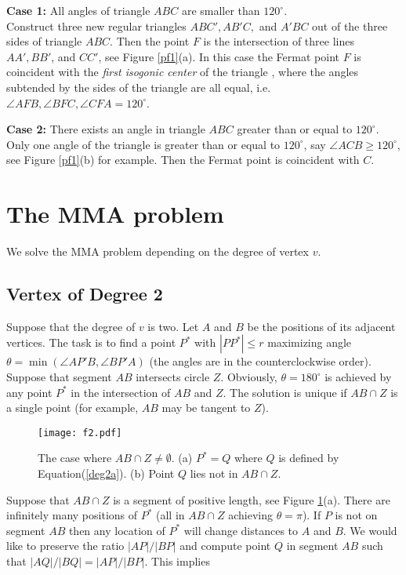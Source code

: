\documentclass[10pt]{article}
\begin{document}
 {\bf Case 1:}  All angles of triangle $ABC$ are smaller than $120^\circ$.\\
Construct three new regular triangles $ABC', AB'C,$ and $A'BC$ out of the three sides of triangle $ABC$.
Then the point $F$ is the intersection of three lines $AA',BB'$, and $CC'$, see Figure \ref{pf1}(a). 
In this case the Fermat point $F$  is coincident with the {\em first isogonic center} 
of the triangle \cite{Eric}, where the angles subtended by the sides of the triangle are all equal, 
i.e.  $\angle AFB, \angle BFC, \angle CFA=120^\circ$.

{\bf Case 2:}  There exists an angle  in triangle $ABC$ greater than or equal to $120^\circ$.\\
Only one angle of the triangle is greater than or equal to $120^\circ$, say $\angle ACB\ge 120^\circ$, see Figure \ref{pf1}(b) for example.
Then the Fermat point is coincident with $C$.





\section{The MMA problem} \label{s:MAA}

We solve the MMA problem depending on the degree of vertex $v$. 

\subsection{Vertex of Degree 2} \label{sectdeg2}

Suppose that the degree of $v$ is two.  
Let $A$ and $B$ be the positions of its adjacent vertices. 
The task is to find a point $P^*$ with $|PP^*|\le r$ maximizing angle $\theta=\min(\angle AP'B,\angle BP'A)$ (the angles are in the counterclockwise order).
Suppose that segment $AB$ intersects circle  $Z$.
Obviously, $\theta=180^\circ$ is achieved by any point $P^*$ in the intersection of $AB$ and $Z$.
The solution is unique if $AB\cap Z$ is a single point (for example, $AB$ may be tangent to $Z$). 


\begin{figure}[htp] 
\centering
\texttt{[image: f2.pdf]}
\caption{ The case where $AB\cap Z\ne\emptyset$. (a) $P^*=Q$ where $Q$ is defined by Equation(\ref{deg2a}). (b) Point $Q$ lies not in $AB\cap Z$.}
\label{f2}
\end{figure}

Suppose that $AB\cap Z$ is a segment of positive length, see Figure \ref{f2}(a).
There are infinitely many positions of $P^*$ (all in $AB\cap Z$ achieving $\theta=\pi$).
If $P$ is not on segment $AB$ then any location of $P^*$ will change distances to $A$ and $B$.
We would like to preserve the ratio $|AP|/|BP|$ and compute point $Q$ in segment $AB$ 
such that $|AQ|/|BQ|=|AP|/|BP|$. This implies
\end{document}
